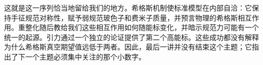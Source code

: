 \begin{classroomqa}
\end{classroomqa}

\begin{classroomqa}
\end{classroomqa}

这就是这一序列恰当地留给我们的地方。希格斯机制使标准模型在内部自洽：它保持手征规范对称性，赋予弱规范玻色子和费米子质量，并预言物理的希格斯相互作用。重整化随后教给我们这些相互作用如何随能标变化，并暗示规范力可能有一个统一的起源。引力通过一个独立的论证提供了第二个高能标。这些成功都没有解释为什么希格斯真空期望值远低于两者。因此，最后一讲并没有结束这个主题；它指出了下一个主题必须集中关注的那个小数字。